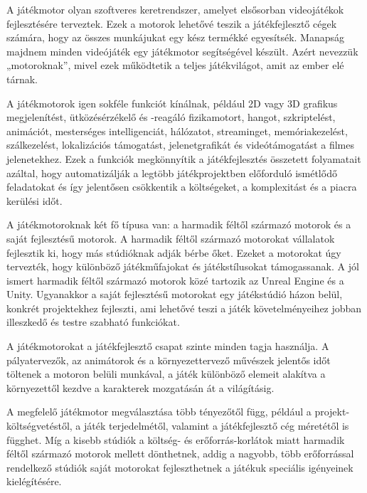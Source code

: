 \newpage


A játékmotor olyan szoftveres keretrendszer, amelyet elsősorban videojátékok fejlesztésére terveztek. Ezek a motorok lehetővé teszik a játékfejlesztő cégek számára, hogy az összes munkájukat egy kész termékké egyesítsék. Manapság majdnem minden videójáték egy játékmotor segítségével készült. Azért nevezzük „motoroknak”, mivel ezek működtetik a teljes játékvilágot, amit az ember elé tárnak. \cite{gameengine1}

A játékmotorok igen sokféle funkciót kínálnak, például 2D vagy 3D grafikus megjelenítést, ütközésérzékelő és -reagáló fizikamotort, hangot, szkriptelést, animációt, mesterséges intelligenciát, hálózatot, streaminget, memóriakezelést, szálkezelést, lokalizációs támogatást, jelenetgrafikát és videótámogatást a filmes jelenetekhez. Ezek a funkciók megkönnyítik a játékfejlesztés összetett folyamatait azáltal, hogy automatizálják a legtöbb játékprojektben előforduló ismétlődő feladatokat és így jelentősen csökkentik a költségeket, a komplexitást és a piacra kerülési időt. 

A játékmotoroknak két fő típusa van: a harmadik féltől származó motorok és a saját fejlesztésű motorok. A harmadik féltől származó motorokat vállalatok fejlesztik ki, hogy más stúdióknak adják bérbe őket. Ezeket a motorokat úgy tervezték, hogy különböző játékműfajokat és játékstílusokat támogassanak. A jól ismert harmadik féltől származó motorok közé tartozik az Unreal Engine és a Unity. Ugyanakkor a saját fejlesztésű motorokat egy játékstúdió házon belül, konkrét projektekhez fejleszti, ami lehetővé teszi a játék követelményeihez jobban illeszkedő és testre szabható funkciókat. 

A játékmotorokat a játékfejlesztő csapat szinte minden tagja használja. A pályatervezők, az animátorok és a környezettervező művészek jelentős időt töltenek a motoron belüli munkával, a játék különböző elemeit alakítva a környezettől kezdve a karakterek mozgatásán át a világításig.

A megfelelő játékmotor megválasztása több tényezőtől függ, például a projekt-költségvetéstől, a játék terjedelmétől, valamint a játékfejlesztő cég méretétől is függhet. Míg a kisebb stúdiók a költség- és erőforrás-korlátok miatt harmadik féltől származó motorok mellett dönthetnek, addig a nagyobb, több erőforrással rendelkező stúdiók saját motorokat fejleszthetnek a játékuk speciális igényeinek kielégítésére. 


